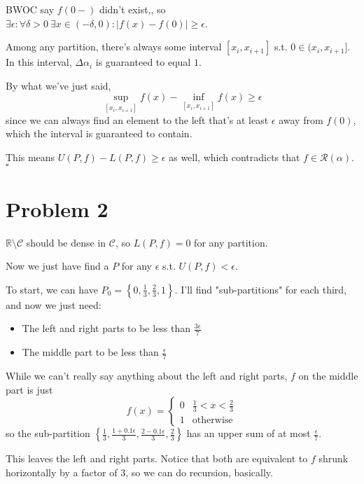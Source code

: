 \documentclass[12pt]{article}
\newcommand{\R}{\mathbb{R}}
\begin{document}

BWOC say $f(0-)$ didn't exist,,
so $\exists \epsilon: \forall \delta > 0\ \exists x \in (-\delta, 0): |f(x)-f(0)| \ge \epsilon$.

Among any partition, there's always some interval $[x_i, x_{i+1}]$ s.t. $0 \in (x_i, x_{i+1}]$.
In this interval, $\Delta \alpha_i$ is guaranteed to equal $1$.

By what we've just said,
\[\sup_{[x_i, x_{i+1}]} f(x)-\inf_{[x_i, x_{i+1}]} f(x) \ge \epsilon\]
since we can always find an element to the left that's at least $\epsilon$ away from $f(0)$,
which the interval is guaranteed to contain.

This means $U(P, f) - L(P, f) \ge \epsilon$ as well,
which contradicts that $f \in \mathcal{R}(\alpha)$. $\square$

\section{Problem 2}

$\R \setminus \mathcal{C}$ should be dense in $\mathcal{C}$, so $L(P, f)=0$ for any partition.

Now we just have find a $P$ for any $\epsilon$ s.t. $U(P, f) < \epsilon$.

To start, we can have $P_0=\left\{0, \frac{1}{3}, \frac{2}{3}, 1\right\}$.
I'll find "sub-partitions" for each third, and now we just need:
\begin{itemize}
  \item The left and right parts to be less than $\frac{3\epsilon}{7}$
  \item The middle part to be less than $\frac{\epsilon}{7}$
\end{itemize}

While we can't really say anything about the left and right parts, $f$ on the middle part is just
\[f(x)=\begin{cases}
    0 & \frac{1}{3} < x < \frac{2}{3} \\
    1 & \text{otherwise}
  \end{cases}\]
so the sub-partition $\left\{\frac{1}{3}, \frac{1+0.1\epsilon}{3}, \frac{2-0.1\epsilon}{3}, \frac{2}{3}\right\}$
has an upper sum of at most $\frac{\epsilon}{7}$.

This leaves the left and right parts.
Notice that both are equivalent to $f$ shrunk horizontally by a factor of $3$, so we can do recursion, basically.
\end{document}
